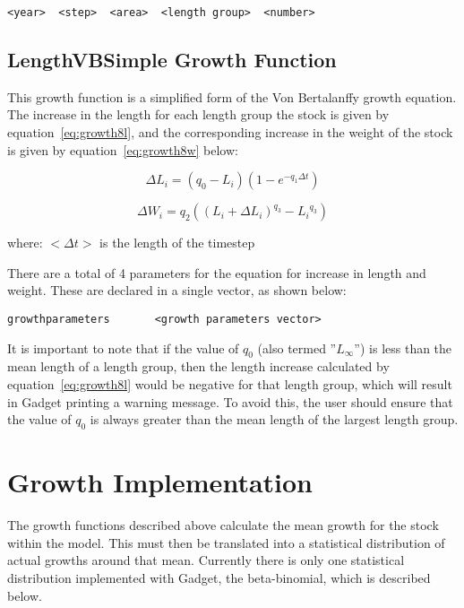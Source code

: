 \documentclass[10pt,twoside]{book}
\begin{document}
{\small\begin{verbatim}
<year>  <step>  <area>  <length group>  <number>
\end{verbatim}}

\subsection{LengthVBSimple Growth Function}\label{subsec:growth8}
This growth function is a simplified form of the Von Bertalanffy growth equation.  The increase in the length for each length group the stock is given by equation~\ref{eq:growth8l}, and the corresponding increase in the weight of the stock is given by equation~\ref{eq:growth8w} below:

\begin{equation}\label{eq:growth8l}
\Delta L_{i} = \left( q_{0} - L_{i} \right) \left( 1 - e^{-q_{1} \Delta t} \right)
\end{equation}

\begin{equation}\label{eq:growth8w}
\Delta W_{i} = q_{2} \left( \left( L_{i} + \Delta L_{i} \right) ^{q_{3}} - {L_{i}}^{q_{3}} \right)
\end{equation}

where:\newline
$<\Delta t>$ is the length of the timestep

\bigskip
There are a total of 4 parameters for the equation for increase in length and weight.  These are declared in a single vector, as shown below:

{\small\begin{verbatim}
growthparameters       <growth parameters vector>
\end{verbatim}}

It is important to note that if the value of $q_{0}$ (also termed ''$L_{\infty}$'') is less than the mean length of a length group, then the length increase calculated by equation~\ref{eq:growth8l} would be negative for that length group, which will result in Gadget printing a warning message.  To avoid this, the user should ensure that the value of $q_{0}$ is always greater than the mean length of the largest length group.

\section{Growth Implementation}\label{sec:stockgrowthimplement}
The growth functions described above calculate the mean growth for the stock within the model. This must then be translated into a statistical distribution of actual growths around that mean.  Currently there is only one statistical distribution implemented with Gadget, the beta-binomial, which is described below.
\end{document}
